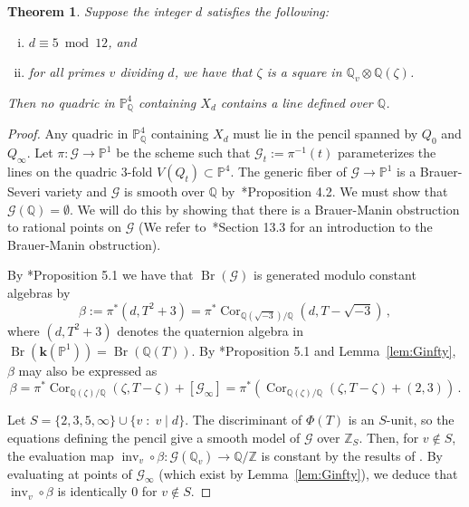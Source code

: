 \documentclass[12pt, reqno]{amsart}
\newtheorem{thm}[lemma]{Theorem}
\theoremstyle{definition}
\newcommand{\PP}{{\mathbb P}}
\newcommand{\Q}{{\mathbb Q}}
\newcommand{\Z}{{\mathbb Z}}
\newcommand{\kk}{{\mathbf k}}
\newcommand{\calG}{{\mathcal G}}
\DeclareMathOperator{\inv}{inv}
\DeclareMathOperator{\Cor}{Cor}
\DeclareMathOperator{\Br}{Br}
\begin{document}
\begin{thm}\label{thm:d}
	Suppose the integer $d$ satisfies the following:
\begin{enumerate}[(i)]
	\item\label{it:1} $d \equiv 5 \bmod 12$, and
	\item\label{it:4} for all primes $v$ dividing $d$, we have that $\zeta$ is a square in $\Q_v\otimes \Q(\zeta)$.
\end{enumerate}
Then no quadric in $\PP^4_\Q$ containing $X_d$ contains a line defined over $\Q$.
\end{thm}



\begin{proof}
Any quadric in $\PP^4_\Q$ containing $X_d$ must lie in the pencil spanned by $Q_0$ and $Q_\infty$. Let $\pi\colon\calG \to \PP^1$ be the scheme such that $\calG_t := \pi^{-1}(t)$ parameterizes the lines on the quadric $3$-fold $V(Q_t) \subset \PP^4$. The generic fiber of $\calG \to \PP^1$ is a Brauer-Severi variety and $\calG$ is smooth over $\Q$ by~\cite{CV}*{Proposition 4.2}. We must show that $\calG(\Q)= \emptyset$. We will do this by showing that there is a Brauer-Manin obstruction to rational points on $\calG$ (We refer to~\cite{CTS-BrauerBook}*{Section 13.3} for an introduction to the Brauer-Manin obstruction). 

By \cite{CV}*{Proposition 5.1} we have that $\Br(\calG)$ is generated modulo constant algebras by 
\begin{equation}\label{eq:beta}
\beta := 
\pi^*(d,T^2 + 3) = \pi^*{\Cor_{\Q(\sqrt{-3})/\Q}(d, T - \sqrt{-3})}\,,
\end{equation}
where $(d,T^2+3)$ denotes the quaternion algebra in $\Br(\kk(\PP^1)) = \Br(\Q(T))$. By \cite{CV}*{Proposition 5.1} and Lemma~\ref{lem:Ginfty}, $\beta$ may also be expressed as
\begin{equation}\label{eq:beta2}
	\beta = \pi^*\Cor_{\Q(\zeta)/\Q}(\zeta, T - \zeta) + [\calG_\infty] = \pi^*\left(\Cor_{\Q(\zeta)/\Q}(\zeta, T - \zeta) + (2,3)\right)\,.
\end{equation}

Let $S = \{ 2,3,5,\infty \} \cup \{ v \;:\; v \mid d \}$. The discriminant of $\Phi(T)$ is an $S$-unit, so the equations defining the pencil give a smooth model of $\calG$ over $\Z_S$. Then, for $v \not\in S$, the evaluation map $\inv_v\circ \beta \colon \calG(\Q_v) \to \Q/\Z$ is constant by the results of \cite{GoodReductionBM}. By evaluating at points of \(\calG_{\infty}\) (which exist by Lemma~\ref{lem:Ginfty}), we deduce that \(\inv_v\circ \beta\) is identically \(0\) for \(v\notin S\). 


\end{proof}
\end{document}
